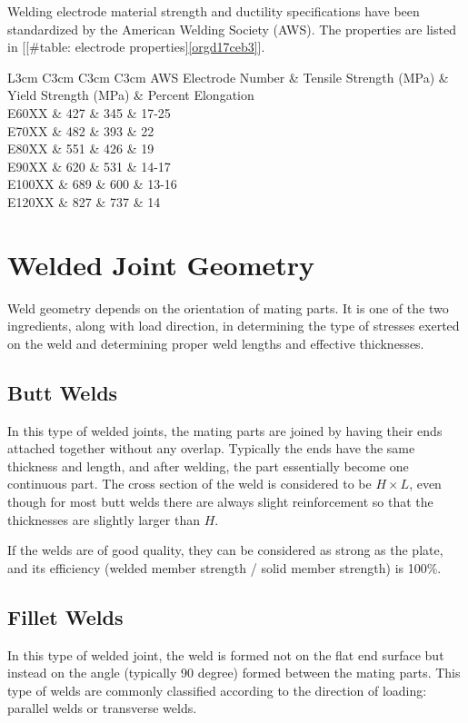 \documentclass[a4paper,openany,12pt]{book}
\begin{document}
{{Welding electrode material strength and ductility specifications have
been standardized by the American Welding Society (AWS). The properties
are listed in
[[\#table: electrode properties]\ref{orgd17ceb3}].


 L3cm C3cm C3cm C3cm AWS Electrode Number \& Tensile Strength (MPa) \&
Yield Strength (MPa) \& Percent Elongation\\
E60XX \& 427 \& 345 \& 17-25\\
E70XX \& 482 \& 393 \& 22\\
E80XX \& 551 \& 426 \& 19\\
E90XX \& 620 \& 531 \& 14-17\\
E100XX \& 689 \& 600 \& 13-16\\
E120XX \& 827 \& 737 \& 14\\

\section{Welded Joint Geometry}
\label{sec:orgb38e6a5}
Weld geometry depends on the orientation of mating parts. It is one of
the two ingredients, along with load direction, in determining the type
of stresses exerted on the weld and determining proper weld lengths and
effective thicknesses.

\subsection{Butt Welds}
\label{sec:orgb4f38a9}
In this type of welded joints, the mating parts are joined by having
their ends attached together without any overlap. Typically the ends
have the same thickness and length, and after welding, the part
essentially become one continuous part. The cross section of the weld is
considered to be \(H \times L\), even though for most butt welds there are
always slight reinforcement so that the thicknesses are slightly larger
than \(H\).


If the welds are of good quality, they can be considered as strong as
the plate, and its efficiency (welded member strength / solid member
strength) is 100\%.

\subsection{Fillet Welds}
\label{sec:org7b25eb4}
In this type of welded joint, the weld is formed not on the flat end
surface but instead on the angle (typically 90 degree) formed between
the mating parts. This type of welds are commonly classified according
to the direction of loading: parallel welds or transverse welds.


}}
\end{document}
